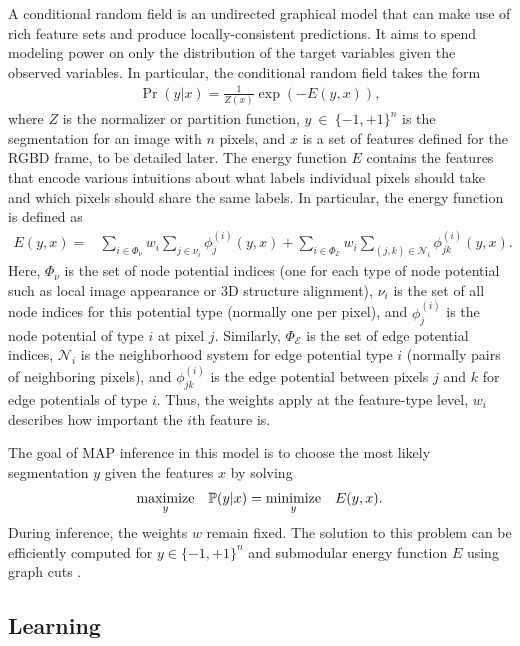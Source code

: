 \documentclass[graybox]{svmult}
\begin{document}
A conditional random field is an undirected graphical model that can make use of rich feature sets and produce locally-consistent predictions.  It aims to spend modeling power on only the distribution of the target variables given the observed variables.  In particular, the conditional random field takes the form
\begin{align}
  \Pr(y | x) = \frac{1}{Z(x)} \exp(-E(y, x)),
\end{align}
where $Z$ is the normalizer or partition function, $y~\in~\{-1,+1\}^n$ is the segmentation for an image with $n$ pixels, and $x$ is a set of features defined for the RGBD frame, to be detailed later.  The energy function $E$ contains the features that encode various intuitions about what labels individual pixels should take and which pixels should share the same labels.  In particular, the energy function is defined as
\begin{align}
  E(y, x) = & \sum_{i \in \Phi_\nu} w_i \sum_{j \in \nu_i} \phi_j^{(i)}(y, x) \label{eqn:energy} + \sum_{i \in \Phi_{\mathcal{E}}} w_i \sum_{(j,k) \in \mathcal{N}_i}  \phi_{jk}^{(i)}(y, x).
\end{align}
Here, $\Phi_\nu$ is the set of node potential indices (\ie one for each type of node potential such as local image appearance or 3D structure alignment), $\nu_i$ is the set of all node indices for this potential type (normally one per pixel), and $\phi_j^{(i)}$ is the node potential of type $i$ at pixel $j$.  Similarly, $\Phi_\mathcal{E}$ is the set of edge potential indices, $\mathcal{N}_i$ is the neighborhood system for edge potential type $i$ (normally pairs of neighboring pixels), and $\phi_{jk}^{(i)}$ is the edge potential between pixels $j$ and $k$ for edge potentials of type $i$.  Thus, the weights apply at the feature-type level, \ie $w_i$ describes how important the $i$th feature is.

The goal of MAP inference in this model is to choose the most likely segmentation $y$ given the features $x$ by solving
\begin{align}
  \underset{y}{\mbox{maximize}}\quad \mathbb{P}(y | x) = \underset{y}{\mbox{minimize}}\quad E(y, x).
\end{align}
During inference, the weights $w$ remain fixed.  The solution to this problem can be efficiently computed for $y \in \{-1, +1\}^n$ and submodular energy function $E$ using graph cuts \cite{boykov2001a}.

\subsection{Learning}
\label{sec:learning}
\end{document}
